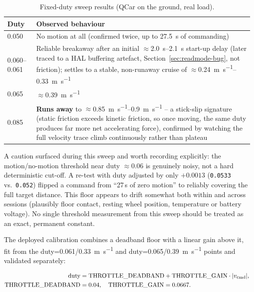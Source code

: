 \begin{table}[htbp]
  \centering
  \caption{Fixed-duty sweep results (QCar on the ground, real load).}
  \label{tab:duty-sweep}
  \begin{tabular}{@{}p{2cm}p{12.5cm}@{}}
    \toprule
    Duty & Observed behaviour \\
    \midrule
    0.050 & No motion at all (confirmed twice, up to \SI{27.5}{\second} of commanding) \\
    0.060--0.061 & Reliable breakaway after an initial $\approx$\SIrange{2.0}{2.1}{\second} start-up delay (later traced to a HAL buffering artefact, Section~\ref{sec:readmode-bug}, not friction); settles to a stable, non-runaway cruise of $\approx$\SIrange{0.24}{0.33}{\meter\per\second} \\
    0.065 & $\approx$\SI{0.39}{\meter\per\second} \\
    0.085 & \textbf{Runs away} to $\approx$\SIrange{0.85}{0.9}{\meter\per\second} -- a stick-slip signature (static friction exceeds kinetic friction, so once moving, the same duty produces far more net accelerating force), confirmed by watching the full velocity trace climb continuously rather than plateau \\
    \bottomrule
  \end{tabular}
\end{table}

A caution surfaced during this sweep and worth recording explicitly:
the motion/no-motion threshold near duty $\approx 0.06$ is genuinely
noisy, not a hard deterministic cut-off. A re-test with duty
adjusted by only $+0.0013$ (\texttt{0.0533} vs.\ \texttt{0.052})
flipped a command from ``27\,s of zero motion'' to reliably covering
the full target distance. This floor appears to drift somewhat both
within and across sessions (plausibly floor contact, resting wheel
position, temperature or battery voltage). No single threshold
measurement from this sweep should be treated as an exact, permanent
constant.

The deployed calibration combines a deadband floor with a linear gain
above it, fit from the duty=0.061/\SI{0.33}{\meter\per\second} and
duty=0.065/\SI{0.39}{\meter\per\second} points and validated
separately:

\begin{align}
  \text{duty} &= \text{THROTTLE\_DEADBAND} + \text{THROTTLE\_GAIN} \cdot |v_{\text{cmd}}|, \notag\\
  \text{THROTTLE\_DEADBAND} &= 0.04,\quad \text{THROTTLE\_GAIN} = 0.0667.
  \label{eq:throttle-calibration}
\end{align}


